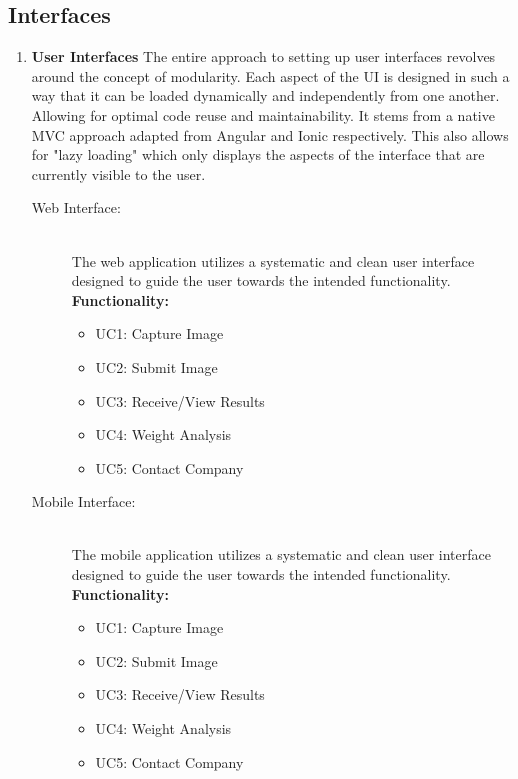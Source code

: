 \documentclass[a4paper, 11pt]{article}
\begin{document}
\subsection{Interfaces}
\begin{enumerate}
    \item \textbf{User Interfaces}
    The entire approach to setting up user interfaces revolves around the concept of modularity. Each aspect of the UI is designed in such a way that it can be loaded dynamically and independently from one another. Allowing for optimal code reuse and maintainability. It stems from a native MVC approach adapted from Angular and Ionic respectively. This also allows for "lazy loading" which only displays the aspects of the interface that are currently visible to the user.
\begin{description}
      \item[Web Interface:] \hfill \\
      The web application utilizes a systematic and clean user interface designed to guide the user towards the intended functionality. \\ 
      \textbf{Functionality:}
      \begin{itemize}
          \item UC1: Capture Image
          \item UC2: Submit Image
          \item UC3: Receive/View Results
          \item UC4: Weight Analysis
          \item UC5: Contact Company
      \end{itemize}
      \item[Mobile Interface:] \hfill \\
      The mobile application utilizes a systematic and clean user interface designed to guide the user towards the intended functionality. \\ 
      \textbf{Functionality:}
      \begin{itemize}
          \item UC1: Capture Image
          \item UC2: Submit Image
          \item UC3: Receive/View Results
          \item UC4: Weight Analysis
          \item UC5: Contact Company
      \end{itemize}

\end{description}
\end{enumerate}
\end{document}
